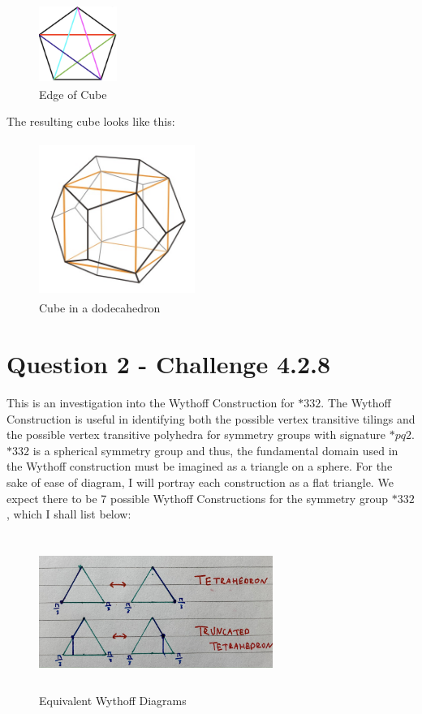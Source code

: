 \documentclass{article}
\begin{document}
\begin{figure}[htbp]
\centerline{\includegraphics[width=
1in, height=1in]{Pentagon.png}}
\caption{Edge of Cube}
\label{fig2}
\end{figure}

The resulting cube looks like this:
\begin{figure}[htbp]
\centerline{\includegraphics[width=
2in, height=2in]{Cube in Dodo.jpg}}
\caption{Cube in a dodecahedron}
\label{fig3}
\end{figure}



\section{Question 2 - Challenge 4.2.8}
This is an investigation into the Wythoff Construction for $*332$. The Wythoff Construction is useful in identifying both the possible vertex transitive tilings and the possible vertex transitive polyhedra for symmetry groups with signature $*pq2$. $*332$ is a spherical symmetry group and thus, the fundamental domain used in the Wythoff construction must be imagined as a triangle on a sphere. For the sake of ease of diagram, I will portray each construction as a flat triangle. We expect there to be 7 possible Wythoff Constructions for the symmetry group $*332$, which I shall list below:
\begin{figure}[htbp]
\centerline{\includegraphics[width=
3in, height=2in]{Wythoff1.JPG}}
\caption{Equivalent Wythoff Diagrams}
\label{fig4}
\end{figure}
\end{document}
